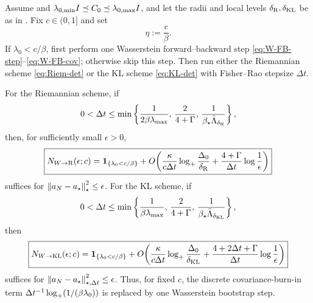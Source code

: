 \begin{theorem}
\label{thm:disc-W-to-FR}
Assume  and
$\lambda_{0,\min}I\preceq C_0\preceq\lambda_{0,\max}I$, and let the radii and
local levels $\delta_{\mathrm{R}},\delta_{\mathrm{KL}}$ be as in . Fix $c\in(0,1]$ and set
\[
    \eta:=\frac c\beta.
\]
If $\lambda_0<c/\beta$, first perform one Wasserstein forward--backward step
\eqref{eq:W-FB-step}--\eqref{eq:W-FB-cov}; otherwise skip this step. Then run either the
Riemannian scheme \eqref{eq:Riem-det} or the KL scheme \eqref{eq:KL-det} with Fisher--Rao
stepsize $\Delta t$.

For the Riemannian scheme, if
\[
    0<\Delta t\le\min\left\{\frac1{2\beta\lambda_{\max}},\,\frac2{4+\Gamma},\,
    \frac1{\beta_\star\bar\Lambda_{\delta_{\mathrm{R}}}}\right\},
\]
then, for sufficiently small $\epsilon>0$,
\[
    \boxed{
    N_{W\to\mathrm{R}}(\epsilon;c)
    =
    \mathbf 1_{\{\lambda_0<c/\beta\}}
    +
    O\!\left(
        \frac{\kappa}{c\Delta t}\log_+\frac{\Delta_0}{\delta_{\mathrm{R}}}
        +
        \frac{4+\Gamma}{\Delta t}\log\frac1\epsilon
    \right)
    }
\]
suffices for $\left\lVert a_N-a_\star\right\rVert_\star^2\leq\epsilon$. For the KL scheme, if
\[
    0<\Delta t\le\min\left\{\frac1{\beta\lambda_{\max}},\,\frac2{4+\Gamma},\,
    \frac1{\beta_\star\bar\Lambda_{\delta_{\mathrm{KL}}}}\right\},
\]
then
\[
    \boxed{
    N_{W\to\mathrm{KL}}(\epsilon;c)
    =
    \mathbf 1_{\{\lambda_0<c/\beta\}}
    +
    O\!\left(
        \frac{\kappa}{c\Delta t}\log_+\frac{\Delta_0}{\delta_{\mathrm{KL}}}
        +
        \frac{4+2\Delta t+\Gamma}{\Delta t}\log\frac1\epsilon
    \right)
    }
\]
suffices for $\left\lVert a_N-a_\star\right\rVert_{\star,\Delta t}^2\leq\epsilon$.
Thus, for fixed $c$, the discrete covariance-burn-in term
$\Delta t^{-1}\log_+(1/(\beta\lambda_0))$ is replaced by one Wasserstein bootstrap step.
\end{theorem}

